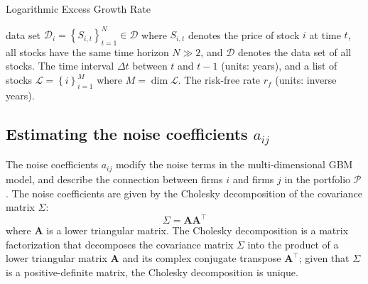 \documentclass[11pt]{article}
\theoremstyle{definition}
\begin{document}
\begin{algorithm}[h]
    \caption{Logarithmic Excess Growth Rate}\label{algo-log-return-distributions-equity}
    \begin{algorithmic}[1]

        \Statex
        \Require data set $\mathcal{D}_{i} = \left\{S_{i,t}\right\}_{t=1}^{N}\in\mathcal{D}$ where $S_{i,t}$ denotes the price of stock $i$ at time $t$, all stocks have the same time horizon $N\gg{2}$, 
		and $\mathcal{D}$ denotes the data set of all stocks.
        \Require The time interval $\Delta{t}$ between $t$ and $t-1$ (units: years), and a list of stocks $\mathcal{L} = \left\{i\right\}_{i=1}^{M}$ where $M = \dim\mathcal{L}$.
        \Require The risk-free rate $r_{f}$ (units: inverse years).
     
        \Statex
            \EndFor
        \EndFor
        \Statex
		\EndProcedure
    \end{algorithmic}
\end{algorithm}

\subsection*{Estimating the noise coefficients $a_{ij}$}
The noise coefficients $a_{ij}$ modify the noise terms in the multi-dimensional GBM model, 
and describe the connection between firms $i$ and firms $j$ in the portfolio $\mathcal{P}$. 
The noise coefficients are given by the Cholesky decomposition of the covariance matrix $\Sigma$:
\begin{equation*}
\Sigma = \mathbf{A}\mathbf{A}^{\top}
\end{equation*}
where $\mathbf{A}$ is a lower triangular matrix. 
The Cholesky decomposition is a matrix factorization that decomposes the covariance matrix $\Sigma$ 
into the product of a lower triangular matrix $\mathbf{A}$ and its complex conjugate transpose $\mathbf{A}^{\top}$;
given that $\Sigma$ is a positive-definite matrix, the Cholesky decomposition is unique.
\end{document}
